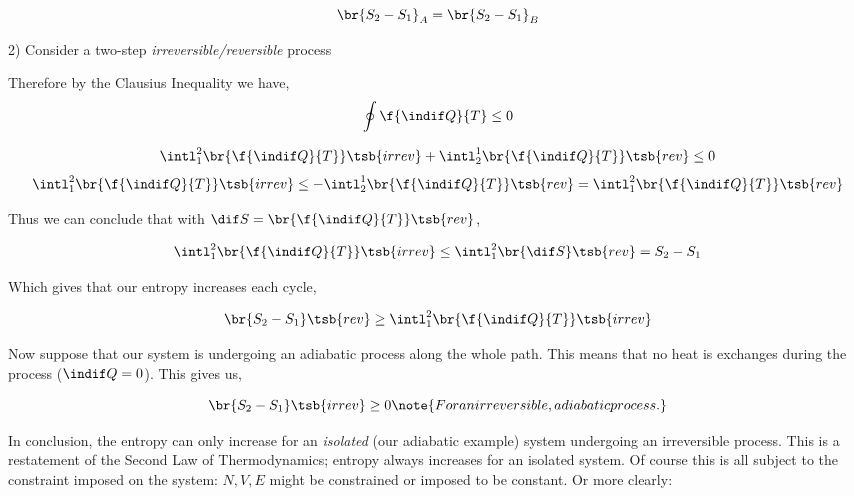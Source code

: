 \documentclass{article}
\begin{document}
\[ \br{S_2 - S_1}_A = \br{S_2 - S_1}_B \]

2) Consider a two-step \textit{irreversible/reversible} process

\begin{center}
\end{center}

Therefore by the Clausius Inequality we have,
\[ \oint \f{\indif Q}{T} \leq 0 \]

\[ \intl_1^2 \br{\f{\indif Q}{T}}\tsb{irrev} + \intl_2^1 \br{\f{\indif Q}{T}}\tsb{rev} \leq 0 \]
\[ \intl_1^2 \br{\f{\indif Q}{T}}\tsb{irrev} \leq - \intl_2^1 \br{\f{\indif Q}{T}}\tsb{rev} = \intl_1^2 \br{\f{\indif Q}{T}}\tsb{rev} \]

Thus we can conclude that with $\dif S = \br{\f{\indif Q}{T}}\tsb{rev}$,

\[ \intl_1^2 \br{\f{\indif Q}{T}}\tsb{irrev} \leq \intl_1^2 \br{\dif S}\tsb{rev} = S_2 - S_1 \]

Which gives that our entropy increases each cycle,

\[ \br{S_2 - S_1}\tsb{rev} \geq \intl_1^2 \br{\f{\indif Q}{T}}\tsb{irrev} \]

Now suppose that our system is undergoing an adiabatic process along the whole path. This means that no heat is exchanges during the process ($\indif Q = 0$). This gives us,

\[ \br{S_2 - S_1}\tsb{irrev} \geq 0 \note{For an irreversible, adiabatic process.}\]

In conclusion, the entropy can only increase for an \textit{isolated} (our adiabatic example) system undergoing an irreversible process. This is a restatement of the Second Law of Thermodynamics; entropy always increases for an isolated system. Of course this is all subject to the constraint imposed on the system: $N, V, E$ might be constrained or imposed to be constant. Or more clearly: \\
\end{document}
